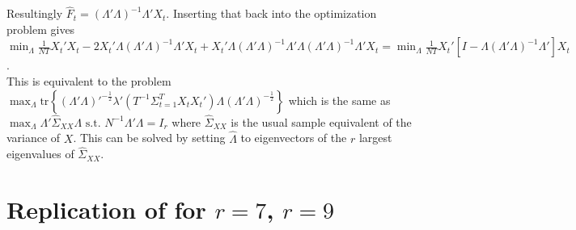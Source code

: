 \documentclass[12pt]{article}
\begin{document}
Resultingly $\hat F_t = (\Lambda' \Lambda)^{-1} \Lambda' X_t$. Inserting that back into the optimization problem gives $\min_\Lambda \frac{1}{NT} X_t'X_t - 2X_t' \Lambda (\Lambda' \Lambda)^{-1} \Lambda'X_t + X_t' \Lambda (\Lambda' \Lambda)^{-1} \Lambda' \Lambda (\Lambda' \Lambda)^{-1} \Lambda'X_t = \min_\Lambda \frac{1}{NT} X_t' [I - \Lambda (\Lambda' \Lambda)^{-1} \Lambda']X_t$. \\
This is equivalent to the problem $\max_\Lambda \text{tr}\left\{(\Lambda'\Lambda)'^{-\frac{1}{2}}\lambda'(T^{-1} \Sigma_{t=1}^T X_tX_t') \Lambda (\Lambda' \Lambda)^{-\frac{1}{2}}\right\}$ which is the same as $\max_\Lambda \Lambda' \hat \Sigma_{XX} \Lambda \text{ s.t. } N^{-1} \Lambda' \Lambda = I_r$ where $\hat \Sigma_{XX}$ is the usual sample equivalent of the variance of $X$. This can be solved by setting $\hat \Lambda$ to eigenvectors of the $r$ largest eigenvalues of $\hat \Sigma_{XX}$.


\newpage
\section{Replication of \citet{bai2002determining} for $r=7$, $r=9$}
\end{document}
